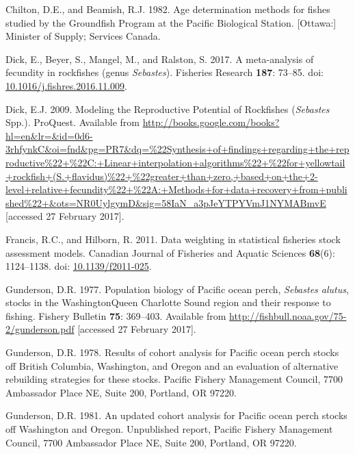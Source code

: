 \documentclass[12pt,]{article}
\begin{document}
\hypertarget{ref-chilton_age_1982}{}
Chilton, D.E., and Beamish, R.J. 1982. Age determination methods for
fishes studied by the Groundfish Program at the Pacific Biological
Station. {[}Ottawa:{]} Minister of Supply; Services Canada.

\hypertarget{ref-dick_meta-analysis_2017}{}
Dick, E., Beyer, S., Mangel, M., and Ralston, S. 2017. A meta-analysis
of fecundity in rockfishes (genus \emph{Sebastes}). Fisheries Research
\textbf{187}: 73--85. doi:
\href{https://doi.org/10.1016/j.fishres.2016.11.009}{10.1016/j.fishres.2016.11.009}.

\hypertarget{ref-dick_modeling_2009}{}
Dick, E.J. 2009. Modeling the Reproductive Potential of Rockfishes
(\emph{Sebastes} Spp.). ProQuest. Available from
\url{http://books.google.com/books?hl=en\&lr=\&id=0d6-3rhfynkC\&oi=fnd\&pg=PR7\&dq=\%22Synthesis+of+findings+regarding+the+reproductive\%22+\%22C:+Linear+interpolation+algorithms\%22+\%22for+yellowtail+rockfish+(S.+flavidus)\%22+\%22greater+than+zero,+based+on+the+2-level+relative+fecundity\%22+\%22A:+Methods+for+data+recovery+from+published\%22+\&ots=NR0UylgymD\&sig=58IaN_a3pJeYTPYVmJ1NYMABmvE}
{[}accessed 27 February 2017{]}.

\hypertarget{ref-francis_data_2011}{}
Francis, R.C., and Hilborn, R. 2011. Data weighting in statistical
fisheries stock assessment models. Canadian Journal of Fisheries and
Aquatic Sciences \textbf{68}(6): 1124--1138. doi:
\href{https://doi.org/10.1139/f2011-025}{10.1139/f2011-025}.

\hypertarget{ref-gunderson_population_1977}{}
Gunderson, D.R. 1977. Population biology of Pacific ocean perch,
\emph{Sebastes alutus}, stocks in the WashingtonQueen Charlotte Sound
region and their response to fishing. Fishery Bulletin \textbf{75}:
369--403. Available from
\url{http://fishbull.noaa.gov/75-2/gunderson.pdf} {[}accessed 27
February 2017{]}.

\hypertarget{ref-gunderson_results_1978}{}
Gunderson, D.R. 1978. Results of cohort analysis for Pacific ocean perch
stocks off British Columbia, Washington, and Oregon and an evaluation of
alternative rebuilding strategies for these stocks. Pacific Fishery
Management Council, 7700 Ambassador Place NE, Suite 200, Portland, OR
97220.

\hypertarget{ref-gunderson_updated_1981}{}
Gunderson, D.R. 1981. An updated cohort analysis for Pacific ocean perch
stocks off Washington and Oregon. Unpublished report, Pacific Fishery
Management Council, 7700 Ambassador Place NE, Suite 200, Portland, OR
97220.
\end{document}
